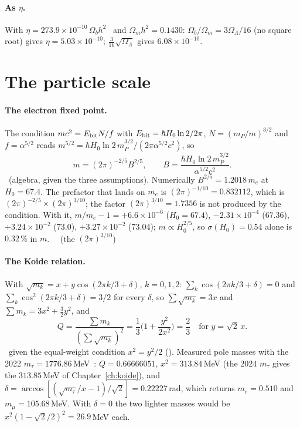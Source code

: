 \paragraph{As $\eta$.} With $\eta=273.9\times10^{-10}\,\Omega_bh^2$~\cite{Steigman2006} and $\Omega_mh^2=0.1430$: $\Omega_b/\Omega_m=3\Omega_\Lambda/16$ (no square root) gives
$\eta=5.03\times10^{-10}$; $\tfrac3{16}\sqrt{\Omega_\Lambda}$ gives $6.08\times10^{-10}$. \calc

\section{The particle scale}\label{app:der:particle}
\paragraph{The electron fixed point.} The condition $mc^2=E_{\rm bit}N/f$ with $E_{\rm bit}=\hbar H_0\ln2/2\pi$, $N=(m_P/m)^{3/2}$ and $f=\alpha^{5/2}$ reads
$m^{5/2}=\hbar H_0\ln2\,m_P^{3/2}/(2\pi\alpha^{5/2}c^2)$, so
\begin{equation}
m=(2\pi)^{-2/5}B^{2/5},\qquad B=\frac{\hbar H_0\ln2\,m_P^{3/2}}{\alpha^{5/2}c^2}.
\end{equation}
\derived\ (algebra, given the three assumptions). Numerically $B^{2/5}=1.2018\,m_e$ at $H_0=67.4$. The prefactor that lands on $m_e$ is $(2\pi)^{-1/10}=0.832112$,
which is $(2\pi)^{-2/5}\times(2\pi)^{3/10}$; the factor $(2\pi)^{3/10}=1.7356$ is not produced by the condition. With it, $m/m_e-1=+6.6\times10^{-6}$
($H_0=67.4$), $-2.31\times10^{-4}$ ($67.36$), $+3.24\times10^{-2}$ ($73.0$), $+3.27\times10^{-2}$ ($73.04$); $m\propto H_0^{2/5}$, so
$\sigma(H_0)=0.54$ alone is $0.32\,\%$ in $m$. \calc\ \openprob\ (the $(2\pi)^{3/10}$)

\paragraph{The Koide relation.} With $\sqrt{m_k}=x+y\cos(2\pi k/3+\delta)$, $k=0,1,2$: $\sum_k\cos(2\pi k/3+\delta)=0$ and $\sum_k\cos^2(2\pi k/3+\delta)=3/2$ for
every $\delta$, so $\sum\sqrt{m_k}=3x$ and $\sum m_k=3x^2+\tfrac32y^2$, and
\begin{equation}
Q=\frac{\sum m_k}{(\sum\sqrt{m_k})^2}=\frac13\Big(1+\frac{y^2}{2x^2}\Big)=\frac23\quad\text{for }y=\sqrt2\,x .
\end{equation}
\derived\ given the equal-weight condition $x^2=y^2/2$ (\conjecture). Measured pole masses with the 2022 $m_\tau=1776.86$\,MeV~\cite{PDG2022}: $Q=0.66666051$, $x^2=313.84$\,MeV (the 2024 $m_\tau$ gives the $313.85$\,MeV of Chapter~\ref{ch:koide}), and
$\delta=\arccos[(\sqrt{m_\tau}/x-1)/\sqrt2]=0.22227$\,rad, which returns $m_e=0.510$ and $m_\mu=105.68$\,MeV. With $\delta=0$ the two lighter masses
would be $x^2(1-\sqrt2/2)^2=26.9$\,MeV each. \calc

